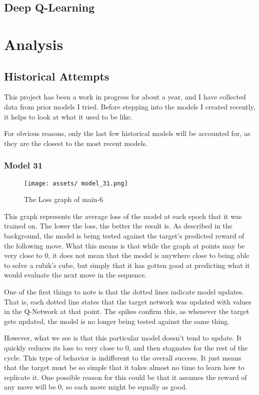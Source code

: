 \documentclass[12pt]{article}
\begin{document}
\subsection{Deep Q-Learning}

\newpage

\section{Analysis}


\subsection{Historical Attempts}

This project has been a work in progress for about a year, and I have collected data from prior models I tried. Before stepping into the models I created recently, it helps to look at what it used to be like.

For obvious reasons, only the last few historical models will be accounted for, as they are the closest to the most recent models.

\subsubsection{Model 31}

\begin{figure}[h]
	\centering
	\texttt{[image: assets/ model\_31.png]}
	\caption{The Loss graph of main-6}
\end{figure}


This graph represents the average loss of the model at each epoch that it was trained on. The lower the loss, the better the result is. As described in the background, the model is being tested against the target's predicted reward of the following move. What this means is that while the graph at points may be very close to $0$, it does not mean that the model is anywhere close to being able to solve a rubik's cube, but simply that it has gotten good at predicting what it would evaluate the next move in the sequence.

One of the first things to note is that the dotted lines indicate model updates. That is, each dotted line states that the target network was updated with values in the Q-Network at that point. The spikes confirm this, as whenever the target gets updated, the model is no longer being tested against the same thing.

However, what we see is that this particular model doesn't tend to update. It quickly reduces its loss to very close to 0, and then stagnates for the rest of the cycle. This type of behavior is indifferent to the overall success. It just means that the target must be so simple that it takes almost no time to learn how to replicate it. One possible reason for this could be that it assumes the reward of any move will be $0$, so each move might be equally as good.
\end{document}
